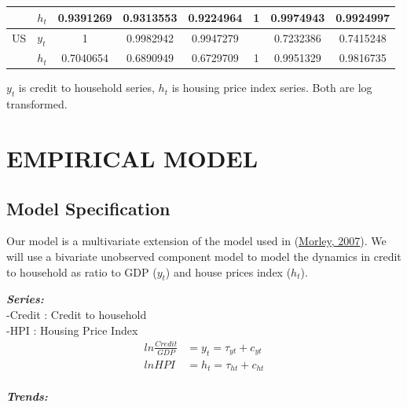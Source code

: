 \documentclass[
  12pt,
]{article}
\begin{document}
\begin{center}
\begin{threeparttable}
\begin{tabular}{@{}llSSSSSS@{}}
                    & $h_t$ & 0.9391269 & 0.9313553& 0.9224964 & 1 & 0.9974943 & 0.9924997 \\[2pt] 
                    \midrule
                    US & $y_t$ & 1 & 0.9982942 & 0.9947279 & & 0.7232386 & 0.7415248  \\[2pt] 
                    
                    & $h_t$ & 0.7040654 & 0.6890949 & 0.6729709 & 1 & 0.9951329 & 0.9816735 \\[2pt] 
                    
                    \bottomrule
                \end{tabular}
                            \begin{tablenotes}
                                \small
                                \item $y_t$ is credit to household series, $h_t$ is housing price index series. Both are log transformed. \\
                            \end{tablenotes}
            \end{threeparttable}
            \end{center}

\hypertarget{empirical-model}{%
\section{EMPIRICAL MODEL}\label{empirical-model}}

\hypertarget{model-specification}{%
\subsection{Model Specification}\label{model-specification}}

Our model is a multivariate extension of the model used in (\protect\hyperlink{ref-morley_slow_2007}{Morley, 2007}). We will use a bivariate unobserved component model to model the dynamics in credit to household as ratio to GDP (\(y_t\)) and house prices index (\(h_t\)).

        \textbf{\textit{Series:}} \\
        -Credit : Credit to household\\
        -HPI : Housing Price Index
        \begin{align}
        ln \frac{Credit}{GDP} &= y_t = \tau_{yt} + c_{yt}
        \\
        ln HPI &= h_t = \tau_{ht} + c_{ht}
        \end{align}
        \\
        \textbf{\textit{Trends:}}
        
\end{document}
